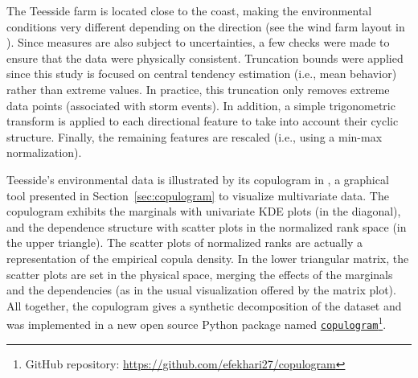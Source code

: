
The Teesside farm is located close to the coast, making the environmental conditions very different depending on the direction (see the wind farm layout in ). 
Since measures are also subject to uncertainties, a few checks were made to ensure that the data were physically consistent. 
Truncation bounds were applied since this study is focused on central tendency estimation (i.e., mean behavior) rather than extreme values. 
In practice, this truncation only removes extreme data points (associated with storm events). 
In addition, a simple trigonometric transform is applied to each directional feature to take into account their cyclic structure. 
Finally, the remaining features are rescaled (i.e., using a min-max normalization). 

Teesside's environmental data is illustrated by its copulogram in , a graphical tool presented in Section~\ref{sec:copulogram} to visualize multivariate data. 
The copulogram exhibits the marginals with univariate KDE plots (in the diagonal), and the dependence structure with scatter plots in the normalized rank space (in the upper triangle). 
The scatter plots of normalized ranks are actually a representation of the empirical copula density. 
In the lower triangular matrix, the scatter plots are set in the physical space, merging the effects of the marginals and the dependencies (as in the usual visualization offered by the matrix plot). 
All together, the copulogram gives a synthetic decomposition of the dataset and was implemented in a new open source Python package named \texttt{\href{https://github.com/efekhari27/copulogram}{copulogram}}\footnote{GitHub repository: \url{https://github.com/efekhari27/copulogram}}.

